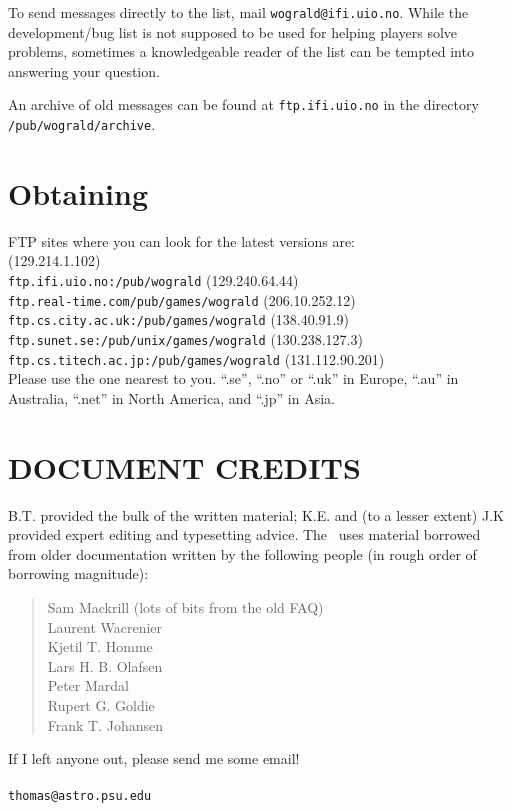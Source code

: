 To send messages directly to the list, mail {\tt wograld@ifi.uio.no}.
While the development/bug list is not supposed to be used for helping
players solve problems, sometimes a knowledgeable reader of the 
list can be tempted into answering your question.

An archive of old messages can be found at {\tt ftp.ifi.uio.no} in the
directory {\tt /pub/wograld/archive}. 

\section{Obtaining \cf } \label{sec:obtain}
 
FTP sites where you can look for the latest versions are: \\
 
 (129.214.1.102) \\
{\tt ftp.ifi.uio.no:/pub/wograld} (129.240.64.44) \\
{\tt ftp.real-time.com/pub/games/wograld} (206.10.252.12) \\
{\tt ftp.cs.city.ac.uk:/pub/games/wograld} (138.40.91.9)\\
{\tt ftp.sunet.se:/pub/unix/games/wograld} (130.238.127.3) \\
{\tt ftp.cs.titech.ac.jp:/pub/games/wograld} (131.112.90.201) \\
 
Please use the one nearest to you.  ``.se'', ``.no'' or ``.uk'' in Europe,
``.au'' in Australia, ``.net'' in North America, and ``.jp'' in Asia.

\section{DOCUMENT CREDITS}

B.T. provided the bulk of the written material; K.E. and 
(to a lesser extent) J.K provided expert editing and typesetting advice. 
The \playbook\ uses material borrowed from older documentation written 
by the following people (in rough order of borrowing magnitude): 
\begin{quote}
Sam Mackrill (lots of bits from the old FAQ) \\
Laurent Wacrenier \\
Kjetil T. Homme \\
Lars H. B. Olafsen \\
Peter Mardal \\
Rupert G. Goldie \\
Frank T. Johansen
\end{quote}
If I left anyone out, please send me some email! \\ 

 \\ {\tt thomas@astro.psu.edu} \\
